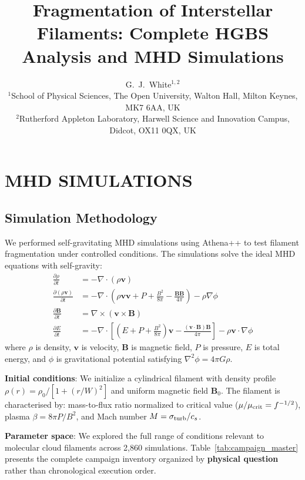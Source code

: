 \documentclass[twocolumn]{mnras}
\title{Fragmentation of Interstellar Filaments: Complete HGBS Analysis and MHD Simulations}
\author[G.~J.~White]{G.~J.~White$^{1,2}$\\
$^{1}$School of Physical Sciences, The Open University, Walton Hall, Milton Keynes, MK7 6AA, UK\\
$^{2}$Rutherford Appleton Laboratory, Harwell Science and Innovation Campus, Didcot, OX11 0QX, UK}
\begin{document}
\maketitle


\section{MHD SIMULATIONS}

\subsection{Simulation Methodology}
\label{sec:methodology}

We performed self-gravitating MHD simulations using Athena++ \citep{Stone2020} to test filament fragmentation under controlled conditions. The simulations solve the ideal MHD equations with self-gravity:
\begin{align}
\frac{\partial \rho}{\partial t} &= -\nabla \cdot (\rho \mathbf{v}) \\
\frac{\partial (\rho \mathbf{v})}{\partial t} &= -\nabla \cdot \left(\rho \mathbf{v} \mathbf{v} + P + \frac{B^2}{8\pi} - \frac{\mathbf{B}\mathbf{B}}{4\pi}\right) - \rho \nabla \phi \\
\frac{\partial \mathbf{B}}{\partial t} &= \nabla \times (\mathbf{v} \times \mathbf{B}) \\
\frac{\partial E}{\partial t} &= -\nabla \cdot \left[(E + P + \frac{B^2}{8\pi})\mathbf{v} - \frac{(\mathbf{v} \cdot \mathbf{B})\mathbf{B}}{4\pi}\right] - \rho \mathbf{v} \cdot \nabla \phi
\end{align}
where $\rho$ is density, $\mathbf{v}$ is velocity, $\mathbf{B}$ is magnetic field, $P$ is pressure, $E$ is total energy, and $\phi$ is gravitational potential satisfying $\nabla^2 \phi = 4\pi G\rho$.

\textbf{Initial conditions}: We initialize a cylindrical filament with density profile $\rho(r) = \rho_0 / [1 + (r/W)^2]$ and uniform magnetic field $\mathbf{B}_0$. The filament is characterised by: mass-to-flux ratio normalized to critical value ($\mu/\mu_{\rm crit} = f^{-1/2}$), plasma $\beta = 8\pi P/B^2$, and Mach number $M = \sigma_{\rm turb}/c_s$.

\textbf{Parameter space}: We explored the full range of conditions relevant to molecular cloud filaments across 2,860 simulations. Table~\ref{tab:campaign_master} presents the complete campaign inventory organized by \textbf{physical question} rather than chronological execution order.
\end{document}
